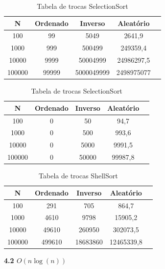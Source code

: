 \documentclass[10pt]{article}
\begin{document}
\begin{table}[H]
  \parbox{.45\linewidth}{
    \centering
    \caption{Tabela de trocas InsertionSort}
    \begin{tabular}{|c|c|c|c|c|}
    \hline
    N & Ordenado & Inverso & Aleatório \\ \hline
    100 & 99 & 5049 & 2641,9 \\ \hline
    1000 & 999 & 500499 & 249359,4 \\ \hline
    10000 & 9999 & 50004999 & 24986297,5 \\ \hline
    100000 & 99999 & 5000049999 & 2498975077 \\ \hline
    \end{tabular}
  }
  \hfill
  \parbox{.45\linewidth}{
    \centering
    \caption{Tabela de trocas SelectionSort}
    \begin{tabular}{|c|c|c|c|c|}
    \hline
    N & Ordenado & Inverso & Aleatório \\ \hline
    100 & 0 & 50 & 94,7 \\ \hline
    1000 & 0 & 500 & 993,6 \\ \hline
    10000 & 0 & 5000 & 9991,5 \\ \hline
    100000 & 0 & 50000 & 99987,8 \\ \hline
    \end{tabular}
  }
\end{table}

\begin{table}[H]
  \centering
  \caption{Tabela de trocas ShellSort}
  \begin{tabular}{|c|c|c|c|c|}
  \hline
  N & Ordenado & Inverso & Aleatório \\ \hline
  100 & 291 & 705 & 864,7 \\ \hline
  1000 & 4610 & 9798 & 15905,2 \\ \hline
  10000 & 49610 & 260950 & 302073,5 \\ \hline
  100000 & 499610 & 18683860 & 12465339,8 \\ \hline
  \end{tabular}
\end{table}

\vspace{0.5cm}

\textbf{4.2 $O(n \log(n))$}
\end{document}
